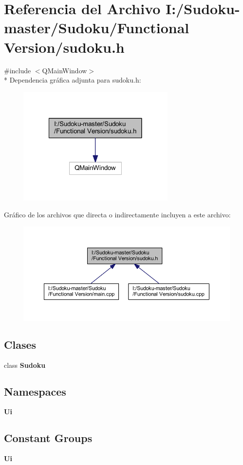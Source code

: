 \section{Referencia del Archivo I\-:/\-Sudoku-\/master/\-Sudoku/\-Functional Version/sudoku.h}
\label{sudoku_8h}
{\ttfamily \#include $<$Q\-Main\-Window$>$}\\*
Dependencia gráfica adjunta para sudoku.\-h\-:
\nopagebreak
\begin{figure}[H]
\begin{center}
\leavevmode
\includegraphics[width=222pt]{sudoku_8h__incl}
\end{center}
\end{figure}
Gráfico de los archivos que directa o indirectamente incluyen a este archivo\-:
\nopagebreak
\begin{figure}[H]
\begin{center}
\leavevmode
\includegraphics[width=350pt]{sudoku_8h__dep__incl}
\end{center}
\end{figure}
\subsection*{Clases}
\begin{DoxyCompactItemize}
\item 
class {\bf Sudoku}
\end{DoxyCompactItemize}
\subsection*{Namespaces}
\begin{DoxyCompactItemize}
\item 
{\bf Ui}
\end{DoxyCompactItemize}
\subsection*{Constant Groups}
\begin{DoxyCompactItemize}
\item 
{\bf Ui}
\end{DoxyCompactItemize}
